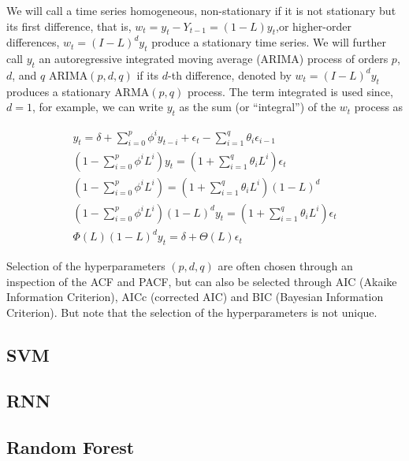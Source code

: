 \documentclass[
  11pt,
]{article}
\numberwithin{equation}{section}
\begin{document}
We will call a time series homogeneous, non-stationary if it is not
stationary but its first difference, that is,
\(w_{t} = y_{t} - Y_{t-1} =(1 - L)y_{t}\),or higher-order differences,
\(w_{t} =(I- L)^{d}y_{t}\) produce a stationary time series. We will
further call \(y_{t}\) an autoregressive integrated moving average
(\(\mathrm{ARIMA}\)) process of orders \(p\), \(d\), and \(q\)
\(\mathrm{ARIMA}(p, d, q)\) if its \(d\)-th difference, denoted by
\(w_{t} =(I- L)^{d}y_{t}\) produces a stationary \(\mathrm{ARMA}(p, q)\)
process. The term integrated is used since, \(d = 1\), for example, we
can write \(y_{t}\) as the sum (or ``integral'') of the \(w_{t}\)
process as

\begin{gather*}
y_{t} = \delta + \sum\limits_{i=0}^{p}\phi^{i}y_{t- i} + \epsilon_{t} - \sum\limits_{i=1}^{q}\theta_{i}\epsilon_{i-1} \\[8pt]
\left(1 - \sum\limits_{i=0}^{p}\phi^{i}L^{i}\right)y_{t} = \left(1 + \sum\limits_{i=1}^{q}\theta_{i}L^{i}\right)\epsilon_{t} \\[8pt]
\left(1 - \sum\limits_{i=0}^{p}\phi^{i}L^{i}\right) = \left(1 + \sum\limits_{i=1}^{q}\theta_{i}L^{i}\right)\left(1 - L\right)^{d} \\[8pt]
\left(1 - \sum\limits_{i=0}^{p}\phi^{i}L^{i}\right)\left(1 - L\right)^{d}y_{t} = \left(1 + \sum\limits_{i=1}^{q}\theta_{i}L^{i}\right)\epsilon_{t} \\[8pt]
\Phi(L)(1 - L)^{d}y_{t} = \delta + \Theta(L)\epsilon_{t}
\end{gather*}

Selection of the hyperparameters \((p, d, q)\) are often chosen through
an inspection of the ACF and PACF, but can also be selected through AIC
(Akaike Information Criterion), AICc (corrected AIC) and BIC (Bayesian
Information Criterion). But note that the selection of the
hyperparameters is not unique.

\hypertarget{svm}{%
\subsection{SVM}\label{svm}}

\hypertarget{rnn}{%
\subsection{RNN}\label{rnn}}

\hypertarget{random-forest}{%
\subsection{Random Forest}\label{random-forest}}
\end{document}
